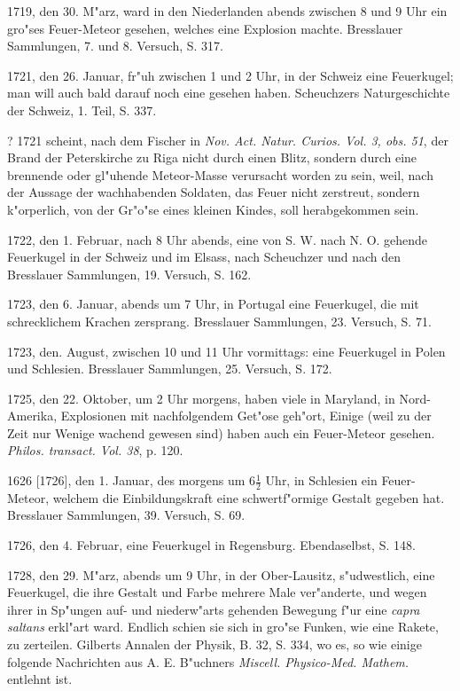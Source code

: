 \documentclass[a4paper, 11pt, oneside, polutonikogreek, german]{article}
\begin{document}
1719, den 30. M"arz, ward in den Niederlanden abends zwischen 8 und 9 Uhr ein gro"ses Feuer-Meteor gesehen, welches eine Explosion machte. Bresslauer Sammlungen, 7. und 8. Versuch, S. 317.

1721, den 26. Januar, fr"uh zwischen 1 und 2 Uhr, in der Schweiz eine Feuerkugel; man will auch bald darauf noch eine gesehen haben. Scheuchzers Naturgeschichte der Schweiz, 1. Teil, S. 337.

? 1721 scheint, nach dem Fischer in \emph{Nov. Act. Natur. Curios. Vol. 3, obs. 51}, der Brand der Peterskirche zu Riga nicht durch einen Blitz, sondern durch eine brennende oder gl"uhende Meteor-Masse verursacht worden zu sein, weil, nach der Aussage der wachhabenden Soldaten, das Feuer nicht zerstreut, sondern k"orperlich, von der Gr"o"se eines kleinen Kindes, soll herabgekommen sein.

1722, den 1. Februar, nach 8 Uhr abends, eine von S. W. nach N. O. gehende Feuerkugel in der Schweiz und im Elsass, nach Scheuchzer und nach den Bresslauer Sammlungen, 19. Versuch, S. 162.

1723, den 6. Januar, abends um 7 Uhr, in Portugal eine Feuerkugel, die mit schrecklichem Krachen zersprang. Bresslauer Sammlungen, 23. Versuch, S. 71.

1723, den. August, zwischen 10 und 11 Uhr vormittags: eine Feuerkugel in Polen und Schlesien. Bresslauer Sammlungen, 25. Versuch, S. 172.

1725, den 22. Oktober, um 2 Uhr morgens, haben viele in Maryland, in Nord-Amerika, Explosionen mit nachfolgendem Get"ose geh"ort, Einige (weil zu der Zeit nur Wenige wachend gewesen sind) haben auch ein Feuer-Meteor gesehen. \emph{Philos. transact. Vol. 38}, p. 120.

1626 [1726], den 1. Januar, des morgens um $\mathfrak{6\frac{1}{2}}$ Uhr, in Schlesien ein Feuer-Meteor, welchem die Einbildungskraft eine schwertf"ormige Gestalt gegeben hat. Bresslauer Sammlungen, 39. Versuch, S. 69.

1726, den 4. Februar, eine Feuerkugel in Regensburg. Ebendaselbst, S. 148.

1728, den 29. M"arz, abends um 9 Uhr, in der Ober-Lausitz, s"udwestlich, eine Feuerkugel, die ihre Gestalt und Farbe mehrere Male ver"anderte, und wegen ihrer in Sp"ungen auf- und niederw"arts gehenden Bewegung f"ur eine \emph{capra saltans} erkl"art ward. Endlich schien sie sich in gro"se Funken, wie eine Rakete, zu zerteilen. Gilberts Annalen der Physik, B. 32, S. 334, wo es, so wie einige folgende Nachrichten aus A. E. B"uchners \emph{Miscell. Physico-Med. Mathem.} entlehnt ist.
\end{document}

